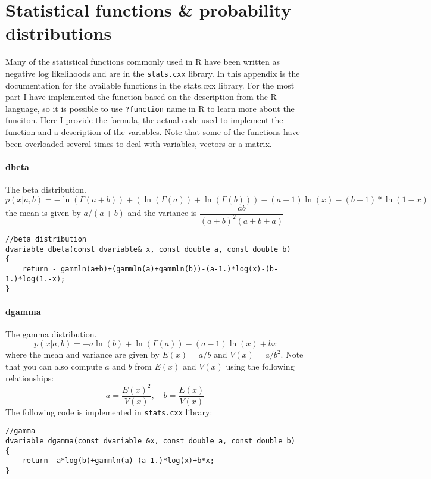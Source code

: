 \section{Statistical functions \& probability distributions}
\begin{multicols}{2}
Many of the statistical functions commonly used in R have been written as negative log likelihoods and are in the \texttt{stats.cxx} library.  In this appendix is the documentation for the available functions in the stats.cxx library.  For the most part I have implemented the function based on the description from the R language, so it is possible to use \texttt{?function} name in R to learn more about the funciton.  Here I provide the formula, the actual code used to implement the function and a description of the variables. Note that some of the functions have been overloaded several times to deal with variables, vectors or a matrix.
\end{multicols}

\paragraph{dbeta} The beta distribution.
\[
	p(x|a,b) = - \ln(\Gamma(a+b))+(\ln(\Gamma(a))+\ln(\Gamma(b)))-(a-1)\ln(x)-(b-1)*\ln(1-x)
\]
the mean is given by $a/(a+b)$ and the variance is $\dfrac{ab}{(a+b)^2(a+b+a)}$
\begin{verbatim}
//beta distribution
dvariable dbeta(const dvariable& x, const double a, const double b)
{
	return - gammln(a+b)+(gammln(a)+gammln(b))-(a-1.)*log(x)-(b-1.)*log(1.-x);
}
\end{verbatim}

\paragraph{dgamma} The gamma distribution.
\[
 p(x|a,b) = -a \ln(b)+\ln(\Gamma(a))-(a-1)\ln(x)+bx
\]
where the mean and variance are given by $E(x) = a/b$ and $V(x) = a/b^2$.   Note that you can also compute $a$ and $b$ from $E(x)$ and $V(x)$ using the following relationships:
\[
 a=\frac{E(x)^2}{V(x)}, \quad b=\frac{E(x)}{V(x)}
\]
\noindent The following code is implemented in \texttt{stats.cxx} library:
\begin{verbatim}
//gamma
dvariable dgamma(const dvariable &x, const double a, const double b)
{
	return -a*log(b)+gammln(a)-(a-1.)*log(x)+b*x;
}
\end{verbatim}


